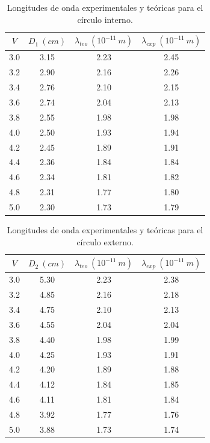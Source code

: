 \documentclass[prb,aps,twocolumn,preprintnumbers,amsmath,amssymb]{revtex4}
\begin{document}
\begin{table}[h!]
	\caption{\label{Tabla 2}Longitudes de onda experimentales y teóricas para el círculo interno.}
	\begin{ruledtabular}
		\begin{tabular}{|cccc|}
			$V$ & $D_{1}\ (cm)$ & $\lambda_{teo}\ (10^{-11}\ m)$ & $\lambda_{exp}\ (10^{-11}\ m)$\\
			\hline
			3.0 & 3.15 & 2.23 & 2.45\\
			3.2 & 2.90 & 2.16 & 2.26\\
			3.4 & 2.76 & 2.10 & 2.15\\
			3.6 & 2.74 & 2.04 & 2.13\\
			3.8 & 2.55 & 1.98 & 1.98\\
			4.0 & 2.50 & 1.93 & 1.94\\
			4.2 & 2.45 & 1.89 & 1.91\\
			4.4 & 2.36 & 1.84 & 1.84\\
			4.6 & 2.34 & 1.81 & 1.82\\
			4.8 & 2.31 & 1.77 & 1.80\\
			5.0 & 2.30 & 1.73 & 1.79\\
		\end{tabular}
	\end{ruledtabular}
\end{table}

\begin{table}[h!]
	\caption{\label{Tabla 3}Longitudes de onda experimentales y teóricas para el círculo externo.}
	\begin{ruledtabular}
		\begin{tabular}{|cccc|}
			$V$ & $D_{2}\ (cm)$ & $\lambda_{teo}\ (10^{-11}\ m)$ & $\lambda_{exp}\ (10^{-11}\ m)$\\
			\hline
			3.0 & 5.30 & 2.23 & 2.38\\
			3.2 & 4.85 & 2.16 & 2.18\\
			3.4 & 4.75 & 2.10 & 2.13\\
			3.6 & 4.55 & 2.04 & 2.04\\
			3.8 & 4.40 & 1.98 & 1.99\\
			4.0 & 4.25 & 1.93 & 1.91\\
			4.2 & 4.20 & 1.89 & 1.88\\
			4.4 & 4.12 & 1.84 & 1.85\\
			4.6 & 4.11 & 1.81 & 1.84\\
			4.8 & 3.92 & 1.77 & 1.76\\
			5.0 & 3.88 & 1.73 & 1.74\\
		\end{tabular}
	\end{ruledtabular}
\end{table}
\end{document}

